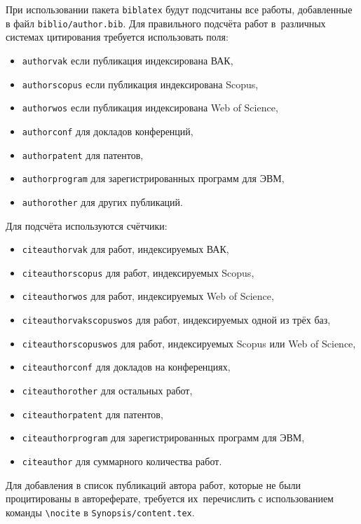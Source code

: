 При использовании пакета \verb!biblatex! будут подсчитаны все работы, добавленные
в файл \verb!biblio/author.bib!. Для правильного подсчёта работ в~различных
системах цитирования требуется использовать поля:
\begin{itemize}
        \item \texttt{authorvak} если публикация индексирована ВАК,
        \item \texttt{authorscopus} если публикация индексирована Scopus,
        \item \texttt{authorwos} если публикация индексирована Web of Science,
        \item \texttt{authorconf} для докладов конференций,
        \item \texttt{authorpatent} для патентов,
        \item \texttt{authorprogram} для зарегистрированных программ для ЭВМ,
        \item \texttt{authorother} для других публикаций.
\end{itemize}
Для подсчёта используются счётчики:
\begin{itemize}
        \item \texttt{citeauthorvak} для работ, индексируемых ВАК,
        \item \texttt{citeauthorscopus} для работ, индексируемых Scopus,
        \item \texttt{citeauthorwos} для работ, индексируемых Web of Science,
        \item \texttt{citeauthorvakscopuswos} для работ, индексируемых одной из трёх баз,
        \item \texttt{citeauthorscopuswos} для работ, индексируемых Scopus или Web of Science,
        \item \texttt{citeauthorconf} для докладов на конференциях,
        \item \texttt{citeauthorother} для остальных работ,
        \item \texttt{citeauthorpatent} для патентов,
        \item \texttt{citeauthorprogram} для зарегистрированных программ для ЭВМ,
        \item \texttt{citeauthor} для суммарного количества работ.
\end{itemize}

Для добавления в список публикаций автора работ, которые не были процитированы в
автореферате, требуется их~перечислить с использованием команды \verb!\nocite! в
\verb!Synopsis/content.tex!.
